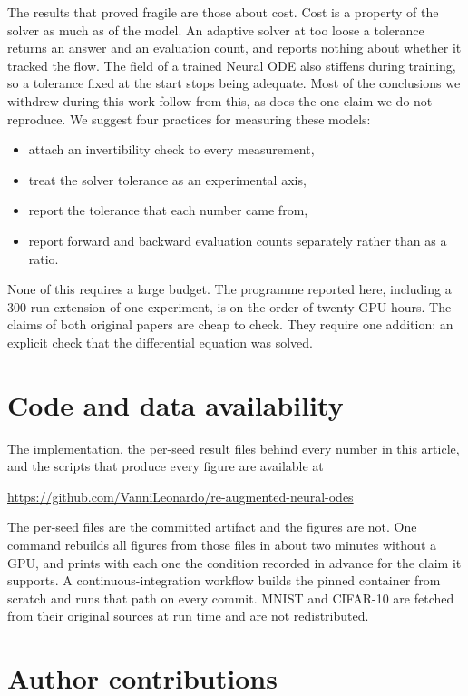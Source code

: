 The results that proved fragile are those about cost. Cost is a property of the solver as much
as of the model. An adaptive solver at too loose a tolerance returns an answer and an evaluation
count, and reports nothing about whether it tracked the flow. The field of a trained Neural ODE
also stiffens during training, so a tolerance fixed at the start stops being adequate. Most of
the conclusions we withdrew during this work follow from this, as does the one claim we do not
reproduce. We suggest four practices for measuring these models:

\begin{itemize}
  \item attach an invertibility check to every measurement,
  \item treat the solver tolerance as an experimental axis,
  \item report the tolerance that each number came from,
  \item report forward and backward evaluation counts separately rather than as a ratio.
\end{itemize}

None of this requires a large budget. The programme reported here, including a 300-run
extension of one experiment, is on the order of twenty GPU-hours. The claims of both original papers are cheap to check. They require one addition: an explicit
check that the differential equation was solved.

\section*{Code and data availability}

The implementation, the per-seed result files behind every number in this article, and the
scripts that produce every figure are available at
\begin{center}\url{https://github.com/VanniLeonardo/re-augmented-neural-odes}\end{center}
The per-seed files are the committed
artifact and the figures are not. One command rebuilds all figures from those files in about
two minutes without a GPU, and prints with each one the condition recorded in advance for the
claim it supports. A continuous-integration workflow builds the pinned container from scratch
and runs that path on every commit. MNIST and CIFAR-10 are fetched from their original sources
at run time and are not redistributed.

\section*{Author contributions}

